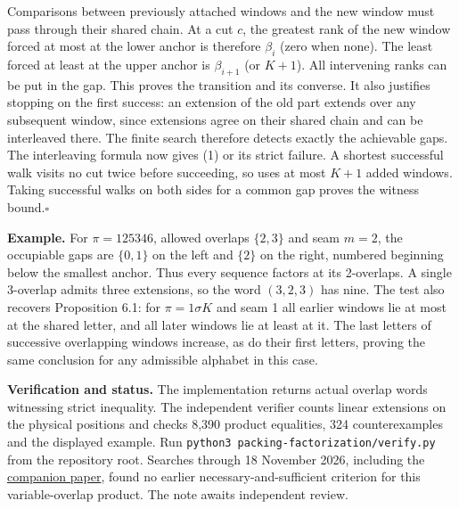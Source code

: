 \documentclass[11pt]{article}
\newcommand{\done}{\hfill\(\square\)}
\begin{document}
Comparisons between previously attached windows and the new window must pass through their shared chain. At a cut $c$, the greatest rank of the new window forced at most at the lower anchor is therefore $\beta_i$ (zero when none). The least forced at least at the upper anchor is $\beta_{i+1}$ (or $K+1$). All intervening ranks can be put in the gap. This proves the transition and its converse. It also justifies stopping on the first success: an extension of the old part extends over any subsequent window, since extensions agree on their shared chain and can be interleaved there. The finite search therefore detects exactly the achievable gaps. The interleaving formula now gives (1) or its strict failure. A shortest successful walk visits no cut twice before succeeding, so uses at most $K+1$ added windows. Taking successful walks on both sides for a common gap proves the witness bound.\done

\textbf{Example.} For $\pi=125346$, allowed overlaps $\{2,3\}$ and seam $m=2$, the occupiable gaps are $\{0,1\}$ on the left and $\{2\}$ on the right, numbered beginning below the smallest anchor. Thus every sequence factors at its 2-overlaps. A single 3-overlap admits three extensions, so the word $(3,2,3)$ has nine. The test also recovers Proposition 6.1: for $\pi=1\sigma K$ and seam 1 all earlier windows lie at most at the shared letter, and all later windows lie at least at it. The last letters of successive overlapping windows increase, as do their first letters, proving the same conclusion for any admissible alphabet in this case.

\small
\textbf{Verification and status.} The implementation returns actual overlap words witnessing strict inequality. The independent verifier counts linear extensions on the physical positions and checks 8,390 product equalities, 324 counterexamples and the displayed example. Run \texttt{python3 packing-factorization/verify.py} from the repository root. Searches through 18 November 2026, including the \href{https://arxiv.org/abs/2611.12829}{companion paper}, found no earlier necessary-and-sufficient criterion for this variable-overlap product. The note awaits independent review.
\end{document}
